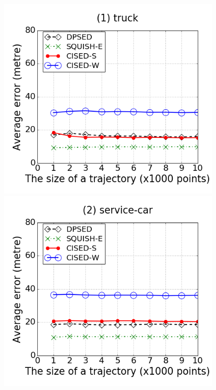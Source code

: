 \begin{figure}[tb!]
\centering
\includegraphics[scale = 0.240]{figures/Exp-error-size-truck.png}
\includegraphics[scale = 0.240]{figures/Exp-error-size-service.png}

\end{figure}
